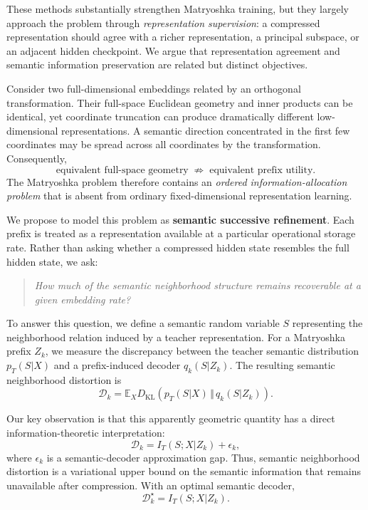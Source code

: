\documentclass[11pt]{article}
\newcommand{\KL}{D_{\mathrm{KL}}}
\newcommand{\E}{\mathbb{E}}
\newcommand{\cD}{\mathcal{D}}
\begin{document}
These methods substantially strengthen Matryoshka training, but they largely approach the problem through \emph{representation supervision}: a compressed representation should agree with a richer representation, a principal subspace, or an adjacent hidden checkpoint.
We argue that representation agreement and semantic information preservation are related but distinct objectives.

Consider two full-dimensional embeddings related by an orthogonal transformation.
Their full-space Euclidean geometry and inner products can be identical, yet coordinate truncation can produce dramatically different low-dimensional representations.
A semantic direction concentrated in the first few coordinates may be spread across all coordinates by the transformation.
Consequently,
\begin{equation}
\boxed{
\text{equivalent full-space geometry}
\;\not\Rightarrow\;
\text{equivalent prefix utility}.
}
\end{equation}
The Matryoshka problem therefore contains an \emph{ordered information-allocation problem} that is absent from ordinary fixed-dimensional representation learning.

We propose to model this problem as \textbf{semantic successive refinement}.
Each prefix is treated as a representation available at a particular operational storage rate.
Rather than asking whether a compressed hidden state resembles the full hidden state, we ask:
\begin{quote}
\emph{How much of the semantic neighborhood structure remains recoverable at a given embedding rate?}
\end{quote}

To answer this question, we define a semantic random variable $S$ representing the neighborhood relation induced by a teacher representation.
For a Matryoshka prefix $Z_k$, we measure the discrepancy between the teacher semantic distribution $p_T(S|X)$ and a prefix-induced decoder $q_k(S|Z_k)$.
The resulting semantic neighborhood distortion is
\begin{equation}
    \cD_k
    =
    \E_X
    \KL
    \left(
        p_T(S|X)
        \,\Vert\,
        q_k(S|Z_k)
    \right).
\end{equation}

Our key observation is that this apparently geometric quantity has a direct information-theoretic interpretation:
\begin{equation}
\boxed{
\cD_k
=
I_T(S;X|Z_k)
+
\epsilon_k,
}
\end{equation}
where $\epsilon_k$ is a semantic-decoder approximation gap.
Thus, semantic neighborhood distortion is a variational upper bound on the semantic information that remains unavailable after compression.
With an optimal semantic decoder,
\begin{equation}
    \cD_k^\star = I_T(S;X|Z_k).
\end{equation}
\end{document}
